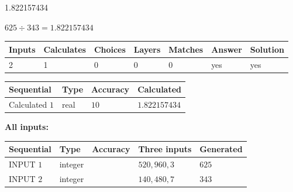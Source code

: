 \documentclass{ctexart}
\begin{document}
 
 
\noindent{}
 
 

1.822157434
 
 
\noindent{}
 
 

 
 
 
\noindent{}
 
 

$ %
625 \div  %
343=   %
1.822157434$
 
 
\noindent{}
 
 

 
   
   
   
   
\noindent\begin{tabular}{|l|l|l|l|l|l|l|}
 \hline
Inputs & Calculates & Choices & Layers & Matches & Answer & Solution \\ \hline
 2  & 
 1  & 
 0
  & 
 0  & 
 0  & 
  yes & 
  yes 
  \\ \hline
 \end{tabular}
   
   
   
   
\noindent{}
   
   
  
  
\noindent\begin{tabular}{|l|l|l|l|}
\hline
 Sequential & Type & Accuracy & Calculated \\ 
\hline
 
 
  Calculated $  1 $ & real & $  10  $ & 
 $ 1.822157434 $ 
 \\  \hline  
 \end{tabular}
   
   
   
   
\noindent\vspace{0.1in}\hspace{-0.08in} {\textbf{\Large{All inputs: }}}
   
   
  
  
\noindent\begin{tabular}{|l|l|l|l|l|}
\hline
 Sequential & Type & Accuracy & Three inputs & Generated \\ 
\hline
 
 
  INPUT $  1 $ & integer &  & $
 520
 , 
 960
 , 
 3
 $ & $ 625 $ 
 \\  \hline  
 
 
  INPUT $  2 $ & integer &  & $
 140
 , 
 480
 , 
 7
 $ & $ 343 $ 
 \\  \hline  
 \end{tabular}
   
\end{document}
